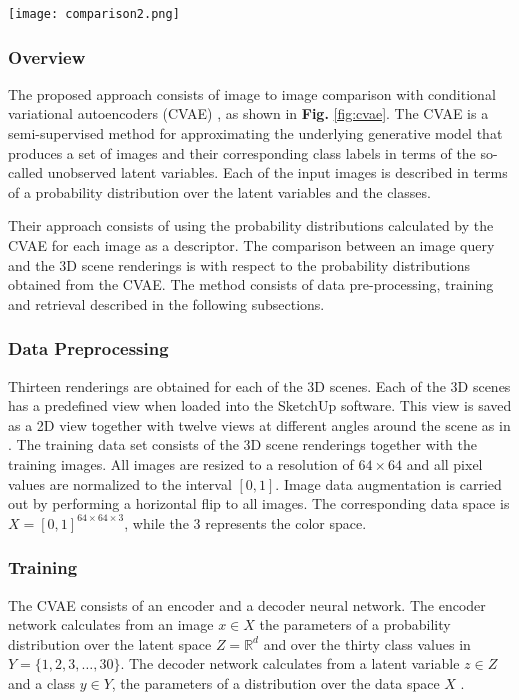 \documentclass[../main.tex]{subfiles}
\begin{document}
\begin{center}
	\centering
	\texttt{[image: comparison2.png]}
\end{center}

\subsubsection{Overview}
The proposed approach consists of image to image comparison with conditional 
variational autoencoders (CVAE) \cite{kingma2014semi}, as shown in \textbf{Fig.} 
\ref{fig:cvae}. The CVAE is a semi-supervised method for approximating the 
underlying generative model that produces a set of images and their 
corresponding class labels in terms of the so-called unobserved latent 
variables. Each of the input images is described in terms of a probability 
distribution over the latent variables and the classes. 

Their approach consists of using the probability distributions calculated by 
the CVAE for each image as a descriptor. The comparison between an image query 
and the 3D scene renderings is with respect to the probability distributions 
obtained from the CVAE. The method consists of data pre-processing, training 
and retrieval described in the following subsections.

\subsubsection{Data Preprocessing}
Thirteen renderings are obtained for each of the 3D scenes. Each of the 3D 
scenes has a predefined view when loaded into the SketchUp software. This view 
is saved as a 2D view together with twelve views at different angles around the 
scene as in \cite{Su2015}.
The training data set consists of the 3D scene renderings together with the 
training images. All images are resized to a resolution of $64\times64$ and all 
pixel values are normalized to the interval $[0,1]$. Image data augmentation is 
carried out by performing a horizontal flip to all images. The corresponding 
data space is $X = [0,1]^{64\times 64 \times 3}$, while the 3 represents the 
color space. 

\subsubsection{Training}
The CVAE consists of an encoder and a decoder neural network. The encoder network calculates from an image $x\in X$ the parameters of a probability distribution over the latent space $Z = \mathbb{R}^d$ and over the thirty class values in $Y = \{1,2,3,\ldots, 30\}$. The decoder network calculates from a latent variable $z\in Z$ and a class $y\in Y$, the parameters of a distribution over the data space $X$ .
\end{document}
